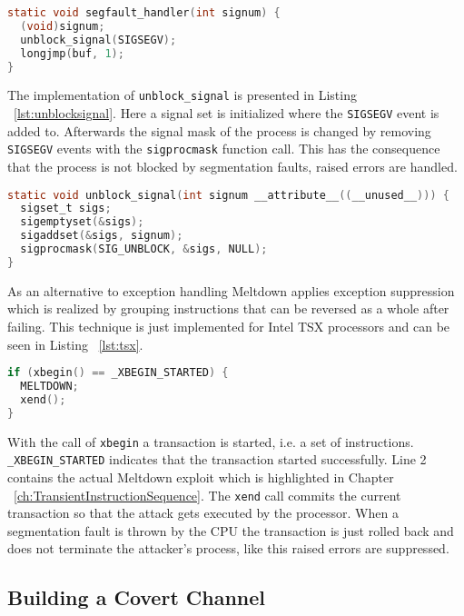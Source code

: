 \documentclass[a4paper,oneside,openright] {scrreprt}
\begin{document}
\begin{lstlisting}[language=C, caption=Meltdown: Exception Handling 1, label={lst:signalhandler}]
static void segfault_handler(int signum) {
  (void)signum;
  unblock_signal(SIGSEGV);
  longjmp(buf, 1);
}
\end{lstlisting}

The implementation of \texttt{unblock\_signal} is presented in Listing ~\ref{lst:unblocksignal}. 
Here a signal set is initialized where the \texttt{SIGSEGV} event is added to.
Afterwards the signal mask of the process is changed by removing \texttt{SIGSEGV} events with the \texttt{sigprocmask} function call.
This has the consequence that the process is not blocked by segmentation faults, raised errors are handled.

\begin{lstlisting}[language=C, caption=Meltdown: Exception Handling 2, label={lst:unblocksignal}]
static void unblock_signal(int signum __attribute__((__unused__))) {
  sigset_t sigs;
  sigemptyset(&sigs);
  sigaddset(&sigs, signum);
  sigprocmask(SIG_UNBLOCK, &sigs, NULL);
}
\end{lstlisting}

As an alternative to exception handling Meltdown applies exception suppression which is realized by grouping instructions
that can be reversed as a whole after failing.
This technique is just implemented for Intel TSX processors and can be seen in Listing ~\ref{lst:tsx}.

\begin{lstlisting}[language=C, caption=Meltdown: Exception Suppression on Intel TSX, label={lst:tsx}]
if (xbegin() == _XBEGIN_STARTED) {
  MELTDOWN;
  xend();
}
\end{lstlisting}

With the call of \texttt{xbegin} a transaction is started, i.e. a set of instructions.
\texttt{\_XBEGIN\_STARTED} indicates that the transaction started successfully.
Line 2 contains the actual Meltdown exploit which is highlighted in Chapter ~\ref{ch:TransientInstructionSequence}.
The \texttt{xend} call commits the current transaction so that the attack gets executed by the processor.
When a segmentation fault is thrown by the CPU the transaction is just rolled back and does not terminate the attacker's process,
like this raised errors are suppressed.

\subsection{Building a Covert Channel}
\label{ch:intro:motivation:A}
\end{document}
